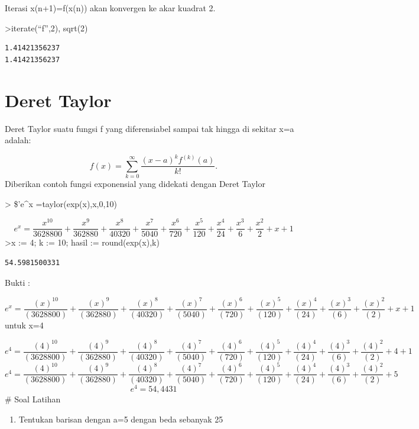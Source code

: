 \documentclass[
]{book}
\providecommand{\tightlist}{%
  \setlength{\itemsep}{0pt}\setlength{\parskip}{0pt}}
\begin{document}
Iterasi x(n+1)=f(x(n)) akan konvergen ke akar kuadrat 2.

\textgreater iterate(``f'',2), sqrt(2)

\begin{verbatim}
1.41421356237
1.41421356237
\end{verbatim}

\chapter{Deret Taylor}\label{deret-taylor}

Deret Taylor suatu fungsi f yang diferensiabel sampai tak hingga di sekitar x=a adalah:

\[f(x) = \sum_{k=0}^\infty \frac{(x-a)^k f^{(k)}(a)}{k!}.\]Diberikan contoh fungsi exponensial yang didekati dengan Deret Taylor

\textgreater{} \$'e\^{}x =taylor(exp(x),x,0,10)

\[e^{x}=\frac{x^{10}}{3628800}+\frac{x^9}{362880}+\frac{x^8}{40320}+  \frac{x^7}{5040}+\frac{x^6}{720}+\frac{x^5}{120}+\frac{x^4}{24}+  \frac{x^3}{6}+\frac{x^2}{2}+x+1\]\textgreater x := 4; k := 10; hasil := round(exp(x),k)

\begin{verbatim}
54.5981500331
\end{verbatim}

Bukti :

\[e^x = \frac{(x)^{10}}{(3628800)} + \frac{(x)^{9}}{(362880)} + \frac{(x)^{8}}{(40320)} + \frac{(x)^{7}}{(5040)} + \frac{(x)^{6}}{(720)} + \frac{(x)^{5}}{(120)} + \frac{(x)^{4}}{(24)} + \frac{(x)^{3}}{(6)} + \frac{(x)^{2}}{(2)} + x + 1\]untuk x=4

\[e^4 = \frac{(4)^{10}}{(3628800)} + \frac{(4)^{9}}{(362880)} + \frac{(4)^{8}}{(40320)} + \frac{(4)^{7}}{(5040)} + \frac{(4)^{6}}{(720)} + \frac{(4)^{5}}{(120)} + \frac{(4)^{4}}{(24)} + \frac{(4)^{3}}{(6)} + \frac{(4)^{2}}{(2)} + 4 + 1\]\[e^4 = \frac{(4)^{10}}{(3628800)} + \frac{(4)^{9}}{(362880)} + \frac{(4)^{8}}{(40320)} + \frac{(4)^{7}}{(5040)} + \frac{(4)^{6}}{(720)} + \frac{(4)^{5}}{(120)} + \frac{(4)^{4}}{(24)} + \frac{(4)^{3}}{(6)} + \frac{(4)^{2}}{(2)} + 5\]\[e^4 = 54,4431\]\# Soal Latihan

\begin{enumerate}
\def\labelenumi{\arabic{enumi}.}
\tightlist
\item
  Tentukan barisan dengan a=5 dengan beda sebanyak 25
\end{enumerate}
\end{document}
